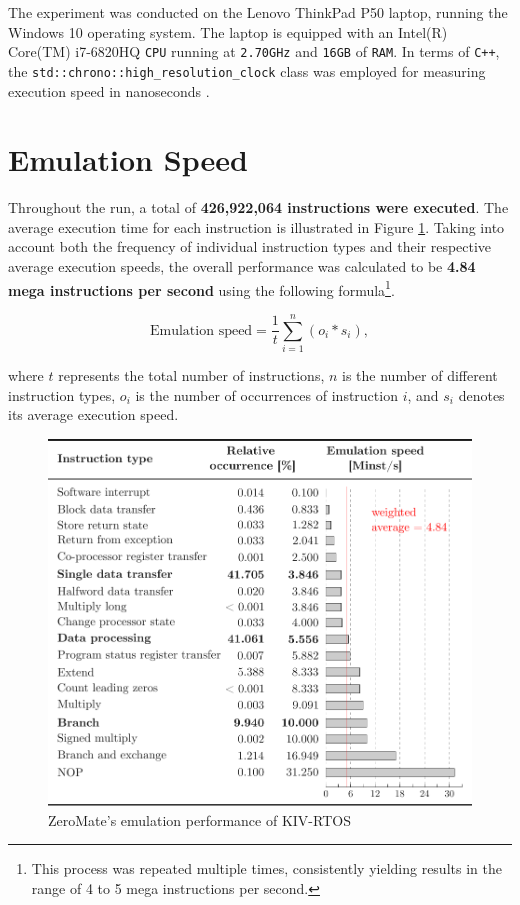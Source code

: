 \documentclass[english, ing, kiv, he, iso690numb, pdf]{fasthesis}
\begin{document}
	\begin{important}
		The experiment was conducted on the Lenovo ThinkPad P50 laptop, running the Windows 10 operating system. The laptop is equipped with an Intel(R) Core(TM) i7-6820HQ \texttt{CPU} running at \texttt{2.70GHz} and \texttt{16GB} of \texttt{RAM}. In terms of \texttt{C++}, the \texttt{std::chrono::high\_resolution\_clock} class was employed for measuring execution speed in nanoseconds \cite{chrono}.
	\end{important}
	
	\newpage
	
	\section{Emulation Speed}
	
	Throughout the run, a total of \textbf{426,922,064 instructions were executed}. The average execution time for each instruction is illustrated in Figure \ref{ZeroMate's emulation performance of KIV-RTOS}. Taking into account both the frequency of individual instruction types and their respective average execution speeds, the overall performance was calculated to be \textbf{4.84 mega instructions per second} using the following formula\footnote{This process was repeated multiple times, consistently yielding results in the range of 4 to 5 mega instructions per second.}.
	
	$$ \text{Emulation speed} = \dfrac{1}{t} \sum_{i=1}^{n} (o_i * s_i), $$
	
	where $t$ represents the total number of instructions, $n$ is the number of different instruction types, $o_i$ is the number of occurrences of instruction $i$, and $s_i$ denotes its average execution speed.
	
	\begin{figure}[ht]
		\centering
		\includegraphics[width=1.0\textwidth]{img/diagrams/performance.pdf}
		\caption{ZeroMate's emulation performance of KIV-RTOS}
		\label{ZeroMate's emulation performance of KIV-RTOS}
	\end{figure}
	
\end{document}
